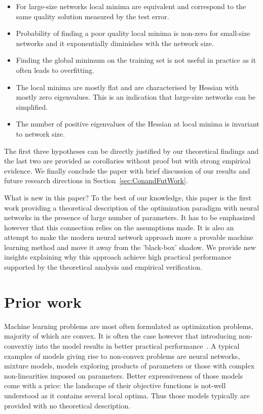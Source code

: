 \documentclass[twoside]{article}
\begin{document}
\begin{itemize}
\item For large-size networks local minima are equivalent and correspond to the same quality solution measured by the test error.
\vspace{-0.05in}
\item Probability of finding a poor quality local minima is non-zero for small-size networks and it exponentially diminishes with the network size.
\vspace{-0.05in}
\item Finding the global minimum on the training set is not useful in practice as it often leads to overfitting.
\vspace{-0.05in}
\item The local minima are mostly flat and are characterised by Hessian with mostly zero eigenvalues. This is an indication that large-size networks can be simplified.
\vspace{-0.05in}
\item The number of positive eigenvalues of the Hessian at local minima is invariant to network size.
\end{itemize}
\vspace{-0.05in}
The first three hypotheses can be directly justified by our theoretical findings and the last two are provided as corollaries without proof but with strong empirical evidence. We finally conclude the paper with brief discussion of our results and future research directions in Section~\ref{sec:ConandFutWork}. 

What is new in this paper? To the best of our knowledge, this paper is the first work providing a theoretical description of the optimization paradigm with neural networks in the presence of large number of parameters. It has to be emphasized however that this connection relies on the assumptions made. It is also an attempt to make the modern neural network approach more a provable machine learning method and move it away from the 'black-box' shadow. We provide new insights explaining why this approach achieve high practical performance supported by the theoretical analysis and empirical verification.

\section{Prior work}
\label{sec:PriorWork}

Machine learning problems are most often formulated as optimization problems, majority of which are convex. It is often the case however that introducing non-convextiy into the model results in better practical performance~\cite{Do:2012:RBM:2503308.2503355, Bengio+chapter2007}. A typical examples of models giving rise to non-convex problems are neural networks, mixture models, models exploring products of parameters or those with complex non-linearities imposed on parameters. Better expressiveness of those models come with a price: the landscape of their objective functions is not-well understood as it contains several local optima. Thus those models typically are provided with no theoretical description. 
\end{document}
